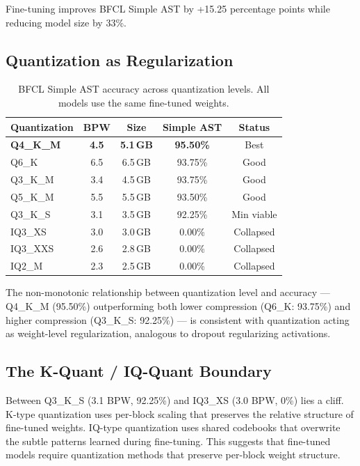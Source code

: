 \documentclass[11pt,a4paper]{article}
\begin{document}
Fine-tuning improves BFCL Simple AST by +15.25 percentage points while reducing model size by 33\%.

\subsection{Quantization as Regularization}

\begin{table}[H]
\centering
\caption{BFCL Simple AST accuracy across quantization levels. All models use the same fine-tuned weights.}
\label{tab:quant}
\begin{tabular}{lcccc}
\toprule
\textbf{Quantization} & \textbf{BPW} & \textbf{Size} & \textbf{Simple AST} & \textbf{Status} \\
\midrule
\textbf{Q4\_K\_M} & \textbf{4.5} & \textbf{5.1\,GB} & \textbf{95.50\%} & Best \\
Q6\_K & 6.5 & 6.5\,GB & 93.75\% & Good \\
Q3\_K\_M & 3.4 & 4.5\,GB & 93.75\% & Good \\
Q5\_K\_M & 5.5 & 5.5\,GB & 93.50\% & Good \\
Q3\_K\_S & 3.1 & 3.5\,GB & 92.25\% & Min viable \\
\midrule
IQ3\_XS & 3.0 & 3.0\,GB & 0.00\% & Collapsed \\
IQ3\_XXS & 2.6 & 2.8\,GB & 0.00\% & Collapsed \\
IQ2\_M & 2.3 & 2.5\,GB & 0.00\% & Collapsed \\
\bottomrule
\end{tabular}
\end{table}

The non-monotonic relationship between quantization level and accuracy --- Q4\_K\_M (95.50\%) outperforming both lower compression (Q6\_K: 93.75\%) and higher compression (Q3\_K\_S: 92.25\%) --- is consistent with quantization acting as weight-level regularization, analogous to dropout regularizing activations.

\subsection{The K-Quant / IQ-Quant Boundary}

Between Q3\_K\_S (3.1 BPW, 92.25\%) and IQ3\_XS (3.0 BPW, 0\%) lies a cliff. K-type quantization uses per-block scaling that preserves the relative structure of fine-tuned weights. IQ-type quantization uses shared codebooks that overwrite the subtle patterns learned during fine-tuning. This suggests that fine-tuned models require quantization methods that preserve per-block weight structure.
\end{document}
